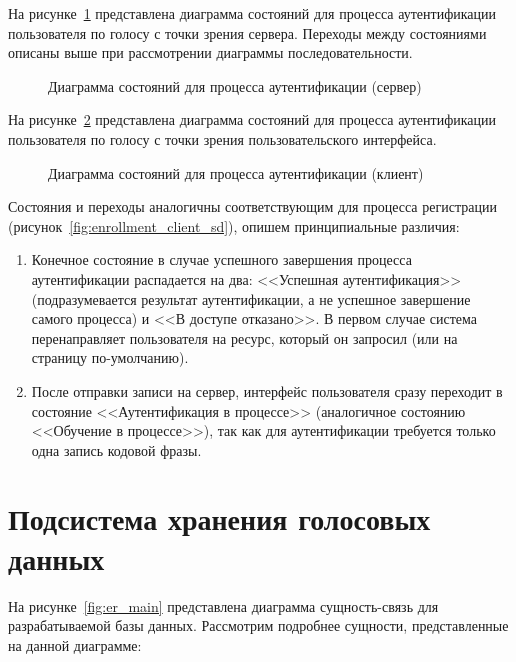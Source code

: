 На рисунке~\ref{fig:verification_server_sd} представлена диаграмма состояний
для процесса аутентификации пользователя по голосу с точки зрения сервера.
Переходы между состояниями описаны выше при рассмотрении диаграммы
последовательности.

\begin{figure}
    \caption{Диаграмма состояний для процесса аутентификации (сервер)}
    \label{fig:verification_server_sd}
\end{figure}

На рисунке~\ref{fig:verification_client_sd} представлена диаграмма состояний для
процесса аутентификации пользователя по голосу с точки зрения пользовательского
интерфейса.

\begin{figure}[htp!]
    \caption{Диаграмма состояний для процесса аутентификации (клиент)}
    \label{fig:verification_client_sd}
\end{figure}

Состояния и переходы аналогичны соответствующим для процесса регистрации
(рисунок~\ref{fig:enrollment_client_sd}), опишем принципиальные различия:

\begin{enumerate}
\item Конечное состояние в случае успешного завершения процесса аутентификации
распадается на два: <<Успешная аутентификация>> (подразумевается результат
аутентификации, а не успешное завершение самого процесса) и <<В доступе
отказано>>. В первом случае система перенаправляет пользователя на ресурс,
который он запросил (или на страницу по-умолчанию).
\item После отправки записи на сервер, интерфейс пользователя сразу переходит в
состояние <<Аутентификация в процессе>> (аналогичное состоянию <<Обучение в
процессе>>), так как для аутентификации требуется только одна запись кодовой
фразы.
\end{enumerate}

\section{Подсистема хранения голосовых данных}
\label{sec:construct:db}

На рисунке~\ref{fig:er_main} представлена диаграмма сущность-связь для разрабатываемой базы данных. Рассмотрим подробнее сущности, представленные на данной диаграмме:

